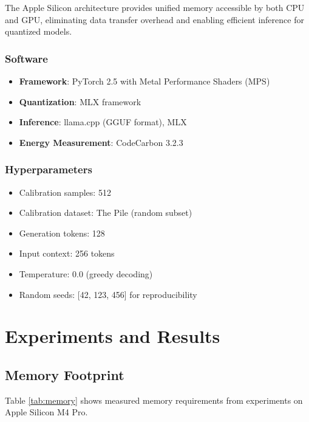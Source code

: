 \documentclass[11pt,a4paper]{article}
\begin{document}
The Apple Silicon architecture provides unified memory accessible by both CPU and GPU, eliminating data transfer overhead and enabling efficient inference for quantized models.

\subsubsection{Software}

\begin{itemize}[leftmargin=*,nosep]
    \item \textbf{Framework}: PyTorch 2.5 with Metal Performance Shaders (MPS)
    \item \textbf{Quantization}: MLX framework
    \item \textbf{Inference}: llama.cpp (GGUF format), MLX
    \item \textbf{Energy Measurement}: CodeCarbon 3.2.3
\end{itemize}


\subsubsection{Hyperparameters}

\begin{itemize}[leftmargin=*,nosep]
    \item Calibration samples: 512
    \item Calibration dataset: The Pile (random subset)
    \item Generation tokens: 128
    \item Input context: 256 tokens
    \item Temperature: 0.0 (greedy decoding)
    \item Random seeds: [42, 123, 456] for reproducibility
\end{itemize}

\section{Experiments and Results}


\subsection{Memory Footprint}

Table \ref{tab:memory} shows measured memory requirements from experiments on Apple Silicon M4 Pro.
\end{document}
